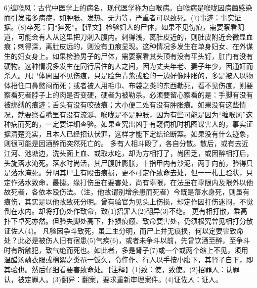 \documentclass[12pt,UTF8]{ctexbook}
\begin{document}
6)缠喉风：古代中医学上的病名，现代医学称为白喉病。白喉病是喉咙因病菌感染而引发诸多病症，如肿胀、发热、无力等，严重者可以致死。(7)事迹：事实证据。(8)卒死：同“猝死”。【译文】检验妇人的尸体，如果不见伤痕，需要察看阴道，可能会有人从这里把刀刺入腹内。刺得浅，离肚皮近的，则肚皮附近会微显血痕；刺得深，离肚皮远的，则没有血痕显现。这种情况多发生在单身妇女、在外谋生的妇女身上。如果检验男子的尸体，需要察看其头顶有没有平头钉，肛门有没有硬物。这种情况多发生在同行居住的人之间，因为丈夫年老、妻子年少，因通奸而杀人。凡尸体周围不见伤痕，只是脸色青紫或脸的一边好像肿胀的，多是被人以物体捂住口鼻憋闷而死；或者被人用毛巾、布袋之类的东西勒死，看不见伤痕，则要察看死者脖子上的肉是否变硬，硬者为被勒杀。必须要留心察看的是：手脚有没有被绑缚的痕迹；舌头有没有咬破痕；大小便二处有没有肿胀痕。如果没有这些情况，就要察看嘴里有没有流涎、喉咙是不是肿胀，因为有些可能是因为“缠喉风”这种病而死的，一定要详细查验。如果查究出凶手有窥伺机时机图谋害人的，事实证据清楚充实，且本人已经招认伏罪，这样才能下定结论断案。如果没有什么迹象，则很可能是因酒醉而突然死亡的。
多有人相斗殴了，各自分散。散后，或有去近江河、池塘边，洗头面上血、或取水吃，却为方相打了，尚困乏，或因醉相打后，头旋落水淹死。落水时尚活，其尸腹肚膨胀，十指甲内有沙泥，两手向前，验得只是落水淹死。分明其尸上有殴击痕损，更不可定作致命去处，但一一札上验状，只定作落水致命，最捷。缘打伤虽在要害处，尚有辜限，在法虽在辜限内及限外以他故死者，各依本殴伤法。（注，他故谓别增余患而死者）今既是落水身死，则虽有痕伤，其实是以他故致死分明。曾有验官为见头上伤损，却定作因打伤迷闷，不觉倒在水内。却将打伤处作致命，致(1)招罪人(2)翻异(3)不绝。
更有相打散，乘高扑下卓死亦然。但验失脚处高下，扑损痕瘢、致命要害处，仍须根究曾见相打分散证佐人(4)。
凡验因争斗致死，虽二主分明，而尸上并无痕损，何以定要害致命处？此必是被伤人旧有宿患(5)气疾(6)，或者未争斗以前，先曾饮酒至醉，至争斗时有所触犯，致气绝而死也。如此者，多是肾子(7)或一个或两个缩上不见，须用温醋汤蘸衣服或棉絮之类罨一饭久，令仵作、行人以手按小腹下，其肾子自下，即其验也。然后仔细看要害致命处。【注释】(1)致：使，致使。(2)招罪人：认罪认，被定罪人。(3)翻异：翻案，要求重新审理案件。(4)证佐人：证人。
\end{document}
